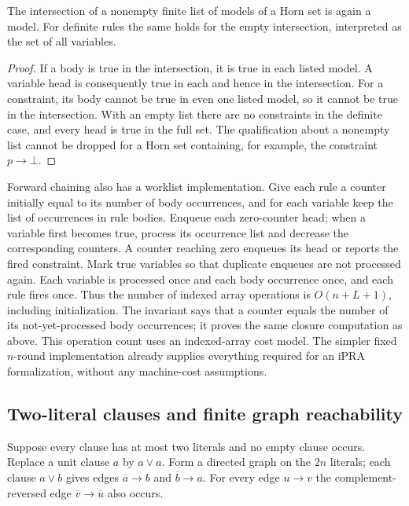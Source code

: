 \begin{corollary}
\label{ca-horn-intersection}
The intersection of a nonempty finite list of models of a Horn set is again
a model.  For definite rules the same holds for the empty intersection,
interpreted as the set of all variables.
\end{corollary}
\begin{proof}
If a body is true in the intersection, it is true in each listed model.
A variable head is consequently true in each and hence in the intersection.
For a constraint, its body cannot be true in even one listed model, so it
cannot be true in the intersection.  With an empty list there are no
constraints in the definite case, and every head is true in the full set.
The qualification about a nonempty list cannot be dropped for a Horn set
containing, for example, the constraint $p\to\bot$.
\end{proof}

Forward chaining also has a worklist implementation.  Give each rule a
counter initially equal to its number of body occurrences, and for each
variable keep the list of occurrences in rule bodies.  Enqueue each
zero-counter head; when a variable first becomes true, process its occurrence
list and decrease the corresponding counters.  A counter reaching zero
enqueues its head or reports the fired constraint.  Mark true variables so
that duplicate enqueues are not processed again.  Each variable is processed
once and each body occurrence once, and each rule fires once.  Thus the
number of indexed array operations is $O(n+L+1)$, including initialization.
The invariant says that a counter equals the number of its not-yet-processed
body occurrences; it proves the same closure computation as above.
This operation count uses an indexed-array cost model.  The simpler fixed
$n$-round implementation already supplies everything required for an iPRA
formalization, without any machine-cost assumptions.

\subsection{Two-literal clauses and finite graph reachability}

Suppose every clause has at most two literals and no empty clause occurs.
Replace a unit clause $a$ by $a\vee a$.  Form a directed graph on the $2n$
literals; each clause $a\vee b$ gives edges
$\overline a\to b$ and $\overline b\to a$.  For every edge $u\to v$ the
complement-reversed edge $\overline v\to\overline u$ also occurs.

